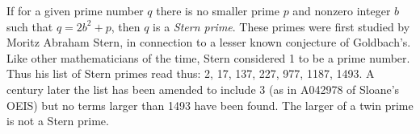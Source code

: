 \documentclass[12pt]{article}
\begin{document}
If for a given prime number $q$ there is no smaller prime $p$ and nonzero integer $b$ such that $q  = 2b^2 + p$, then $q$ is a \emph{Stern prime}. These primes were first studied by Moritz Abraham Stern, in connection to a lesser known conjecture of Goldbach's. Like other mathematicians of the time, Stern considered 1 to be a prime number. Thus his list of Stern primes read thus: 2, 17, 137, 227, 977, 1187, 1493. A century later the list has been amended to include 3 (as in A042978 of Sloane's OEIS) but no terms larger than 1493 have been found. The larger of a twin prime is not a Stern prime.
\end{document}
